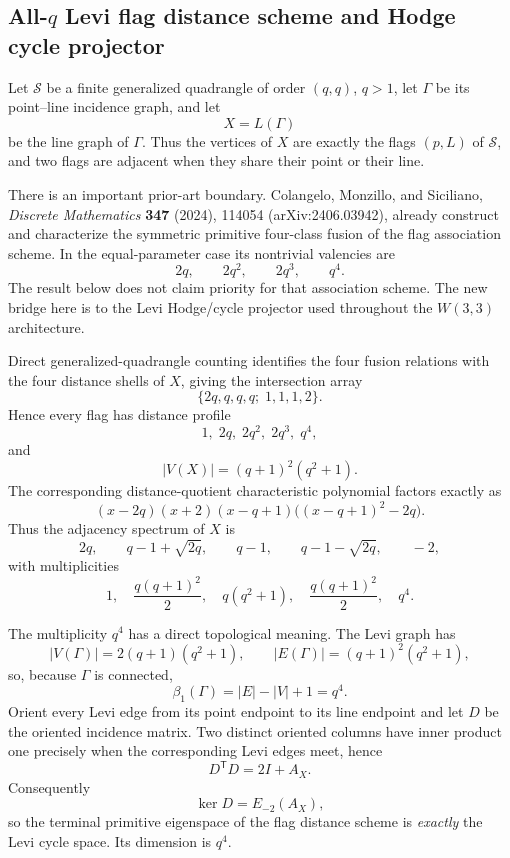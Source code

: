 \subsection{All-\(q\) Levi flag distance scheme and Hodge cycle projector}

Let \(\mathcal S\) be a finite generalized quadrangle of order \((q,q)\), \(q>1\),
let \(\Gamma\) be its point--line incidence graph, and let
\[
X=L(\Gamma)
\]
be the line graph of \(\Gamma\).  Thus the vertices of \(X\) are exactly the flags
\((p,L)\) of \(\mathcal S\), and two flags are adjacent when they share their point or
their line.

There is an important prior-art boundary.  Colangelo, Monzillo, and Siciliano,
\emph{Discrete Mathematics} \textbf{347} (2024), 114054 (arXiv:2406.03942), already
construct and characterize the symmetric primitive four-class fusion of the flag
association scheme.  In the equal-parameter case its nontrivial valencies are
\[
2q,\qquad 2q^2,\qquad 2q^3,\qquad q^4.
\]
The result below does not claim priority for that association scheme.  The new bridge here
is to the Levi Hodge/cycle projector used throughout the \(W(3,3)\) architecture.

Direct generalized-quadrangle counting identifies the four fusion relations with the four
distance shells of \(X\), giving the intersection array
\[
\boxed{
\{2q,q,q,q;\;1,1,1,2\}.
}
\]
Hence every flag has distance profile
\[
\boxed{
1,\;2q,\;2q^2,\;2q^3,\;q^4,
}
\]
and
\[
|V(X)|=(q+1)^2(q^2+1).
\]
The corresponding distance-quotient characteristic polynomial factors exactly as
\[
\boxed{
(x-2q)(x+2)(x-q+1)\bigl((x-q+1)^2-2q\bigr).
}
\]
Thus the adjacency spectrum of \(X\) is
\[
2q,\qquad q-1+\sqrt{2q},\qquad q-1,\qquad
q-1-\sqrt{2q},\qquad -2,
\]
with multiplicities
\[
\boxed{
1,\quad \frac{q(q+1)^2}{2},\quad q(q^2+1),\quad
\frac{q(q+1)^2}{2},\quad q^4.
}
\]

The multiplicity \(q^4\) has a direct topological meaning.  The Levi graph has
\[
|V(\Gamma)|=2(q+1)(q^2+1),
\qquad
|E(\Gamma)|=(q+1)^2(q^2+1),
\]
so, because \(\Gamma\) is connected,
\[
\boxed{
\beta_1(\Gamma)=|E|-|V|+1=q^4.
}
\]
Orient every Levi edge from its point endpoint to its line endpoint and let \(D\) be the
oriented incidence matrix.  Two distinct oriented columns have inner product one precisely
when the corresponding Levi edges meet, hence
\[
\boxed{
D^{\mathsf T}D=2I+A_X.
}
\]
Consequently
\[
\boxed{
\ker D=E_{-2}(A_X),
}
\]
so the terminal primitive eigenspace of the flag distance scheme is \emph{exactly} the
Levi cycle space.  Its dimension is \(q^4\).

